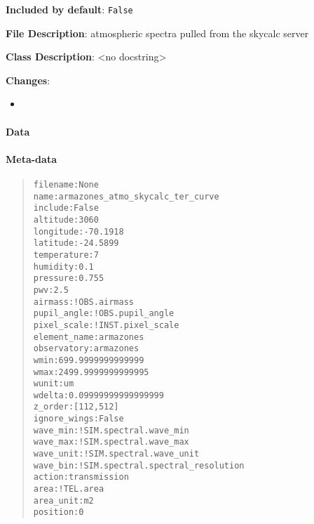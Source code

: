 \textbf{Included by default}: \texttt{False}

\textbf{File Description}: atmospheric spectra pulled from the skycalc server

\textbf{Class Description}: <no docstring>

\textbf{Changes}:

\begin{itemize}
\item \end{itemize}


\paragraph{Data%
  \label{id3}%
}


\paragraph{Meta-data%
  \label{id4}%
}

\begin{quote}
\begin{alltt}
    filename : None
        name : armazones_atmo_skycalc_ter_curve
     include : False
    altitude : 3060
   longitude : -70.1918
    latitude : -24.5899
 temperature : 7
    humidity : 0.1
    pressure : 0.755
         pwv : 2.5
     airmass : !OBS.airmass
 pupil_angle : !OBS.pupil_angle
 pixel_scale : !INST.pixel_scale
element_name : armazones
 observatory : armazones
        wmin : 699.9999999999999
        wmax : 2499.9999999999995
       wunit : um
      wdelta : 0.09999999999999999
     z_order : [112, 512]
ignore_wings : False
    wave_min : !SIM.spectral.wave_min
    wave_max : !SIM.spectral.wave_max
   wave_unit : !SIM.spectral.wave_unit
    wave_bin : !SIM.spectral.spectral_resolution
      action : transmission
        area : !TEL.area
   area_unit : m2
    position : 0
\end{alltt}
\end{quote}
